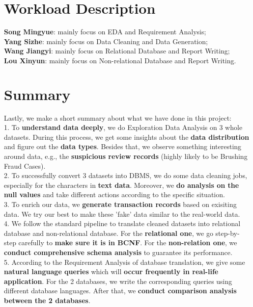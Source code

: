 \documentclass{article}
\begin{document}
	
	\section{Workload Description}
	\textbf{Song Mingyue}: mainly focus on EDA and Requirement Analysis;
	\vspace{3pt}
	\\
	\textbf{Yang Sizhe}: mainly focus on Data Cleaning and Data Generation;
	\vspace{3pt}
	\\
	\textbf{Wang Jiangyi}: mainly focus on Relational Database and Report Writing;
	\vspace{3pt}
	\\
	\textbf{Lou Xinyun}: mainly focus on Non-relational Database and Report Writing.
	\section{Summary}
	Lastly, we make a short summary about what we have done in this project:
	\vspace{3pt}
	\\
	1. To \textbf{understand data deeply}, we do Exploration Data Analysis on 3 whole datasets. During this process, we get some insights about the \textbf{data distribution} and figure out the \textbf{data types}. Besides that, we observe something interesting around data, e.g., the \textbf{suspicious review records} (highly likely to be Brushing Fraud Cases). 
	\vspace{3pt}
	\\
	2. To successfully convert 3 datasets into DBMS, we do some data cleaning jobs, especially for the characters in \textbf{text data}. Moreover, we \textbf{do analysis on the null values} and take different actions according to the specific situation.
	\vspace{3pt}
	\\
	3. To enrich our data, we\textbf{ generate transaction records} based on exisiting data. We try our best to make these 'fake' data similar to the real-world data.
	\vspace{3pt}
	\\
	4. We follow the standard pipeline to translate cleaned datasets into relational database and non-relational database. For the \textbf{relational one}, we go step-by-step carefully to \textbf{make sure it is in BCNF}. For the \textbf{non-relation one}, we \textbf{conduct comprehensive schema analysis} to guarantee its performance.
	\vspace{3pt}
	\\
	5. According to the Requirement Analysis of database translation, we give some \textbf{natural language queries} which will \textbf{occur frequently in real-life application}. For the 2 databases, we write the corresponding queries using different database languages. After that, we \textbf{conduct comparison analysis between the 2 databases}.
	
	
\end{document}
